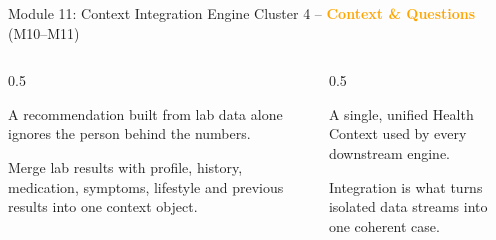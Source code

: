 \documentclass[9pt,aspectratio=169]{beamer}
\begin{document}
\begin{frame}{Module 11: Context Integration Engine}
\textcolor{black!55}{\scriptsize Cluster 4 -- \textcolor{orange}{\textbf{Context \& Questions}} (M10--M11)}\\[2pt]
\begin{columns}[T,onlytextwidth]
\begin{column}{0.5\textwidth}
\begin{tcolorbox}[colback=blue!7,colframe=blue!55!black,title=\textbf{Motivation},boxrule=0.6pt,arc=1mm,left=5pt,right=5pt,top=3pt,bottom=3pt,fonttitle=\small]
\footnotesize A recommendation built from lab data alone ignores the person behind the numbers.
\end{tcolorbox}
\vspace{5pt}
\begin{tcolorbox}[colback=teal!7,colframe=teal!55!black,title=\textbf{Method},boxrule=0.6pt,arc=1mm,left=5pt,right=5pt,top=3pt,bottom=3pt,fonttitle=\small]
\footnotesize Merge lab results with profile, history, medication, symptoms, lifestyle and previous results into one context object.
\end{tcolorbox}
\end{column}
\begin{column}{0.5\textwidth}
\begin{tcolorbox}[colback=green!8,colframe=green!45!black,title=\textbf{Result},boxrule=0.6pt,arc=1mm,left=5pt,right=5pt,top=3pt,bottom=3pt,fonttitle=\small]
\footnotesize A single, unified Health Context used by every downstream engine.
\end{tcolorbox}
\vspace{5pt}
\begin{tcolorbox}[colback=orange!10,colframe=orange!65!black,title=\textbf{Conclusion},boxrule=0.6pt,arc=1mm,left=5pt,right=5pt,top=3pt,bottom=3pt,fonttitle=\small]
\footnotesize Integration is what turns isolated data streams into one coherent case.
\end{tcolorbox}
\end{column}
\end{columns}
\end{frame}
\end{document}
